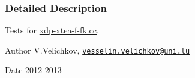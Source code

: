 \subsubsection{\-Detailed \-Description}
\-Tests for \hyperlink{xdp-xtea-f-fk_8cc}{xdp-\/xtea-\/f-\/fk.\-cc}. \begin{DoxyAuthor}{\-Author}
\-V.\-Velichkov, \href{mailto:vesselin.velichkov@uni.lu}{\tt vesselin.\-velichkov@uni.\-lu} 
\end{DoxyAuthor}
\begin{DoxyDate}{\-Date}
2012-\/2013 
\end{DoxyDate}
